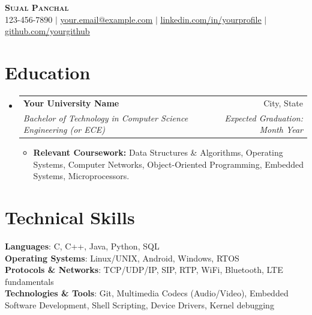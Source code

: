 \documentclass[letterpaper,11pt]{article}
\makeatletter
\newcommand{\resumeItem}[1]{
  \item\small{
    {#1 \vspace{-2pt}}
  }
}
\newcommand{\resumeSubheading}[4]{
  \vspace{-2pt}\item
    \begin{tabular*}{0.97\textwidth}[t]{l@{\extracolsep{\fill}}r}
      \textbf{#1} & #2 \\
      \textit{\small#3} & \textit{\small #4} \\
    \end{tabular*}\vspace{-7pt}
}
\newcommand{\resumeSubHeadingListStart}{\begin{itemize}[leftmargin=0.15in, label={}]}
\newcommand{\resumeSubHeadingListEnd}{\end{itemize}}
\newcommand{\resumeItemListStart}{\begin{itemize}}
\newcommand{\resumeItemListEnd}{\end{itemize}\vspace{-5pt}}
\makeatother
\begin{document}
\begin{center}
    \textbf{\Huge \scshape Sujal Panchal} \\ \vspace{1pt}
    \small 123-456-7890 $|$ \href{mailto:your.email@example.com}{\underline{your.email@example.com}} $|$ 
    \href{https://linkedin.com/in/yourprofile}{\underline{linkedin.com/in/yourprofile}} $|$
    \href{https://github.com/yourgithub}{\underline{github.com/yourgithub}}
\end{center}

\section{Education}
  \resumeSubHeadingListStart
    \resumeSubheading
      {Your University Name}{City, State}
      {Bachelor of Technology in Computer Science Engineering (or ECE)}{Expected Graduation: Month Year}
      \resumeItemListStart
        \resumeItem{\textbf{Relevant Coursework:} Data Structures \& Algorithms, Operating Systems, Computer Networks, Object-Oriented Programming, Embedded Systems, Microprocessors.}
      \resumeItemListEnd
  \resumeSubHeadingListEnd

\section{Technical Skills}
 \begin{itemize}[leftmargin=0.15in, label={}]
    \small{\item{
     \textbf{Languages}{: C, C++, Java, Python, SQL} \\
     \textbf{Operating Systems}{: Linux/UNIX, Android, Windows, RTOS} \\
     \textbf{Protocols \& Networks}{: TCP/UDP/IP, SIP, RTP, WiFi, Bluetooth, LTE fundamentals} \\
     \textbf{Technologies \& Tools}{: Git, Multimedia Codecs (Audio/Video), Embedded Software Development, Shell Scripting, Device Drivers, Kernel debugging} \\
    }}
 \end{itemize}

\end{document}
